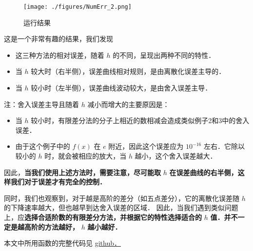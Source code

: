 \begin{figure}[ht]
\centering
\texttt{[image: ./figures/NumErr\_2.png]}
\caption{运行结果} \label{NumErr_fig2}
\end{figure}

这是一个非常有趣的结果，我们发现

\begin{itemize}
\item 这三种方法的相对误差，随着 $h$  的不同，呈现出两种不同的特性．
\item 当  $h$  较大时（右半侧），误差曲线相对规则，是由离散化误差主导的．
\item 当  $h$  较小时（左半侧），误差曲线波动较大，是由舍入误差主导．
\end{itemize}

注：舍入误差主导且随着 $h$ 减小而增大的主要原因是：
\begin{itemize}
\item 当 $h$ 较小时，有限差分法的分子上相近的数相减会造成类似例子2和3中的舍入误差．
\item 由于这个例子中的  $f(x)$ 在  $e$  附近，因此这个误差应为 $10^{-16}$ 左右．它除以较小的 $h$ 时，就会被相应的放大，当  $h$  越小，这个舍入误差越大．
\end{itemize}

因此，\textbf{当我们使用上述方法时，需要注意，尽可能取}  $h$  \textbf{在误差曲线的右半侧，这样我们对于误差才有完全的控制．}

同时，我们也观察到，对于越是高阶的差分（如五点差分），它的离散化误差随  $h$  的下降速率越大，但也越早到达舍入误差的区域． 因此，当我们遇到类似问题上，应\textbf{选择合适阶数的有限差分方法，并根据它的特性选择适合的}  $h$  \textbf{值．并不一定是越高阶的方法越好，}  $h$  \textbf{越小越好．}

本文中所用函数的完整代码见 \href{https://github.com/enigne/ScientificComputingBridging/blob/master/Lab/L2/measureErrors.py}{github．}
